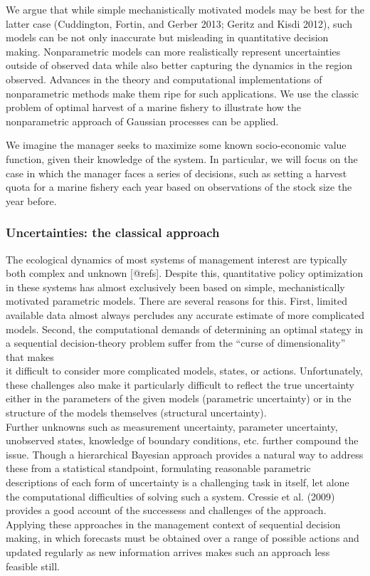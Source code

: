 \documentclass[author-year, review]{elsarticle} %
\begin{document}
We argue that while simple mechanistically motivated models may be best
for the latter case (Cuddington, Fortin, and Gerber 2013; Geritz and
Kisdi 2012), such models can be not only inaccurate but misleading in
quantitative decision making. Nonparametric models can more
realistically represent uncertainties outside of observed data while
also better capturing the dynamics in the region observed. Advances in
the theory and computational implementations of nonparametric methods
make them ripe for such applications. We use the classic problem of
optimal harvest of a marine fishery to illustrate how the nonparametric
approach of Gaussian processes can be applied.

We imagine the manager seeks to maximize some known socio-economic value
function, given their knowledge of the system. In particular, we will
focus on the case in which the manager faces a series of decisions, such
as setting a harvest quota for a marine fishery each year based on
observations of the stock size the year before.

\subsubsection{Uncertainties: the classical approach}

The ecological dynamics of most systems of management interest are
typically both complex and unknown {[}@refs{]}. Despite this,
quantitative policy optimization in these systems has almost exclusively
been based on simple, mechanistically motivated parametric models. There
are several reasons for this. First, limited available data almost
always percludes any accurate estimate of more complicated models.
Second, the computational demands of determining an optimal stategy in a
sequential decision-theory problem suffer from the ``curse of
dimensionality'' that makes\\it difficult to consider more complicated
models, states, or actions. Unfortunately, these challenges also make it
particularly difficult to reflect the true uncertainty either in the
parameters of the given models (parametric uncertainty) or in the
structure of the models themselves (structural uncertainty).\\Further
unknowns such as measurement uncertainty, parameter uncertainty,
unobserved states, knowledge of boundary conditions, etc. further
compound the issue. Though a hierarchical Bayesian approach provides a
natural way to address these from a statistical standpoint, formulating
reasonable parametric descriptions of each form of uncertainty is a
challenging task in itself, let alone the computational difficulties of
solving such a system. Cressie et al. (2009) provides a good account of
the successess and challenges of the approach. Applying these approaches
in the management context of sequential decision making, in which
forecasts must be obtained over a range of possible actions and updated
regularly as new information arrives makes such an approach less
feasible still.
\end{document}
